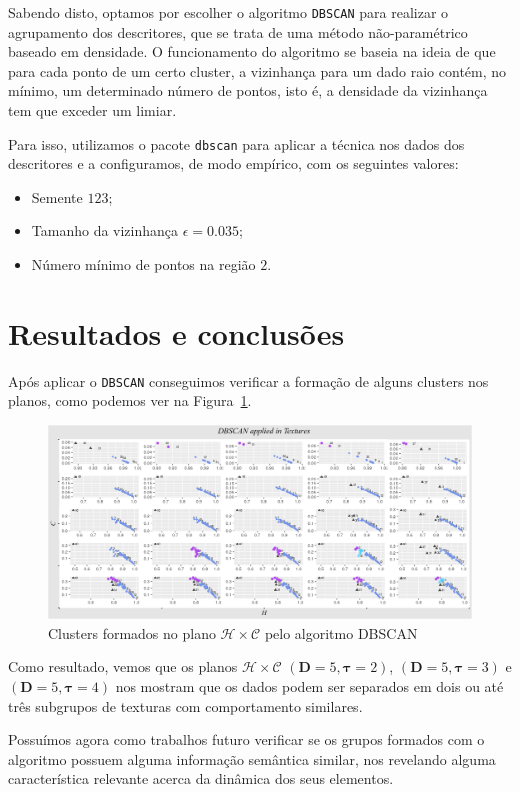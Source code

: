 \documentclass[12pt]{article}
\begin{document}
Sabendo disto, optamos por escolher o algoritmo \texttt{DBSCAN} para realizar o agrupamento dos descritores, que se trata de uma método não-paramétrico baseado em densidade.
O funcionamento do algoritmo se baseia na ideia de que para cada ponto de um certo cluster, a vizinhança para um dado raio contém, no mínimo, um determinado número de pontos, isto é, a densidade da vizinhança tem que exceder um limiar.

Para isso, utilizamos o pacote \texttt{dbscan} para aplicar a técnica nos dados dos descritores e a configuramos, de modo empírico, com os seguintes valores:

\begin{itemize}
    \item Semente $123$;
    \item Tamanho da vizinhança $\epsilon = 0.035$;
    \item Número mínimo de pontos na região $2$.
\end{itemize}

\section{Resultados e conclusões}

Após aplicar o \texttt{DBSCAN} conseguimos verificar a formação de alguns clusters nos planos, como podemos ver na Figura~\ref{fig:dbscan}.

\begin{figure}[!h]
	\centering
	\includegraphics[scale = 0.42]{../../Images/Textures/DBSCAN.png} 
	\caption{Clusters formados no plano $\mathcal H\times \mathcal C$ pelo algoritmo DBSCAN}
	\label{fig:dbscan}
\end{figure}

Como resultado, vemos que os planos $\mathcal H\times \mathcal C$ $(\bm D = 5, \bm \tau = 2)$, $(\bm D = 5, \bm \tau = 3)$ e $(\bm D = 5, \bm \tau = 4)$ nos mostram que os dados podem ser separados em dois ou até três subgrupos de texturas com comportamento similares.  

Possuímos agora como trabalhos futuro verificar se os grupos formados com o algoritmo possuem alguma informação semântica similar, nos revelando alguma característica relevante acerca da dinâmica dos seus elementos.
\end{document}
